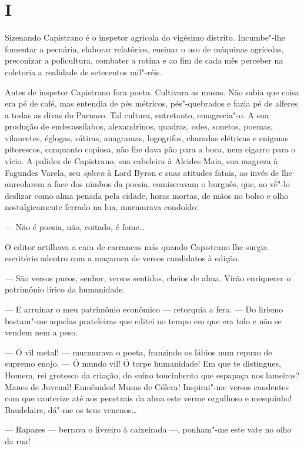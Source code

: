 \section*{I}

Sizenando Capistrano é o inspetor agrícola do vigésimo distrito.
Incumbe"-lhe fomentar a pecuária, elaborar relatórios, ensinar o uso de
máquinas agrícolas, preconizar a policultura, combater a rotina e ao fim
de cada mês perceber na coletoria a realidade de setecentos mil"-réis.

Antes de inspetor Capistrano fora poeta. Cultivara as musas. Não sabia
que coisa era pé de café, mas entendia de pés métricos, pés"-quebrados e
fazia pé de alferes a todas as divas do Parnaso. Tal cultura,
entretanto, emagrecia"-o. A sua produção de endecassílabos, alexandrinos,
quadras, odes, sonetos, poemas, vilancetes, églogas, sátiras, anagramas,
logogrifos, charadas elétricas e enigmas pitorescos, conquanto copiosa,
não lhe dava pão para a boca, nem cigarro para o vício. A palidez de
Capistrano, sua cabeleira à Alcides Maia, sua magreza à Fagundes Varela,
seu \emph{spleen} à Lord Byron e suas atitudes fatais, ao invés de lhe
aureolarem a face dos nimbos da poesia, comiseravam o burguês, que, ao
vê"-lo deslizar como alma penada pela cidade, horas mortas, de mãos no
bolso e olho nostalgicamente ferrado na lua, murmurava condoído:

--- Não é poesia, não, coitado, é fome\ldots{}

O editor artilhava a cara de carrancas más quando Capistrano lhe surgia
escritório adentro com a maçaroca de versos candidatos à edição.

--- São versos puros, senhor, versos sentidos, cheios de alma. Virão
enriquecer o patrimônio lírico da humanidade.

--- E arruinar o meu patrimônio econômico --- retorquia a fera. --- Do
lirismo bastam"-me aquelas prateleiras que editei no tempo em que era
tolo e não se vendem nem a peso.

--- Ó vil metal! --- murmurava o poeta, franzindo os lábios num repuxo
de supremo enojo. --- Ó mundo vil! Ó torpe humanidade! Em que te
distingues, Homem, rei grotesco da criação, do suíno toucinhento que
espapaça nos lameiros? Manes de Juvenal! Eumênides! Musas de Cólera!
Inspirai"-me versos candentes com que cauterize até aos penetrais da alma
este verme orgulhoso e mesquinho! Baudelaire, dá"-me os teus venenos\ldots{}

--- Rapazes --- berrava o livreiro à caixeirada ---, ponham"-me este vate
no olho da rua!

